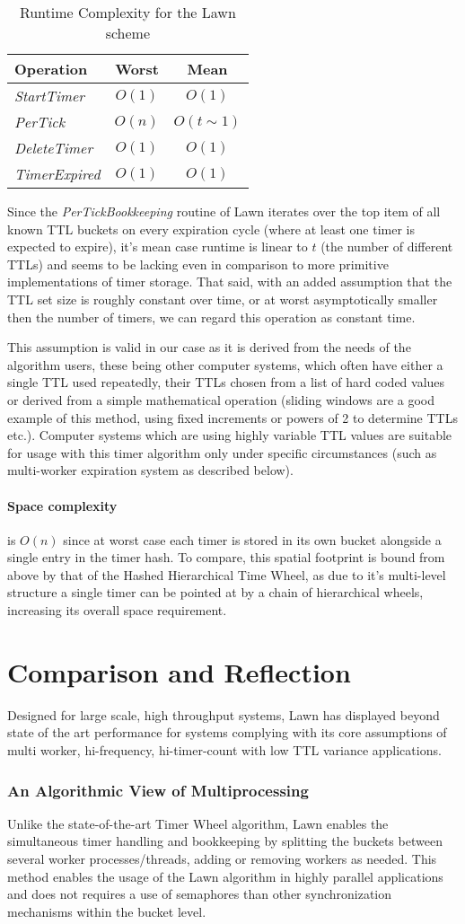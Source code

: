 \documentclass[twocolumn,a4paper]{article}
\newcommand{\advcomplexity}[9]{
\begin{table}[h!]
	\begin{center}
		\begin{tabular}{l|c|c}
			\textbf{Operation} & \textbf{Worst} & \textbf{Mean} \\
			\hline
			\textit{StartTimer} & $O(#1)$ & $O(#2)$ \\
			\textit{PerTick} & $O(#3)$ & $O(#4)$ \\
			\textit{DeleteTimer} & $O(#5)$ & $O(#6)$ \\
			\textit{TimerExpired} & $O(#7)$ & $O(#8)$ \\
		\end{tabular}
		\caption{Runtime Complexity for #9 scheme}
		\label{tab:table1}
	\end{center}
\end{table}
}
\begin{document}
\advcomplexity{1}{1}{n}{t\sim1}{1}{1}{1}{1}{the Lawn}

Since the \textit{PerTickBookkeeping} routine of Lawn iterates over the top item of all known TTL buckets on every expiration cycle (where at least one timer is expected to expire), it's mean case runtime is linear to $t$ (the number of different TTLs) and seems to be lacking even in comparison to more primitive implementations of timer storage. That said, with an added assumption that the TTL set size is roughly constant over time, or at worst asymptotically smaller then the number of timers, we can regard this operation as constant time.

This assumption is valid in our case as it is derived from the needs of the algorithm users, these being other computer systems, which often have either a single TTL used repeatedly, their TTLs chosen from a list of hard coded values or derived from a simple mathematical operation (sliding windows are a good example of this method, using fixed increments or powers of 2 to determine TTLs etc.). Computer systems which are using highly variable TTL values are suitable for usage with this timer algorithm only under specific circumstances (such as multi-worker expiration system as described below).


\paragraph{Space complexity} is $O(n)$ since at worst case each timer is stored in its own bucket alongside a single entry in the timer hash. To compare, this spatial footprint is bound from above by that of the Hashed Hierarchical Time Wheel, as due to it's multi-level structure a single timer can be pointed at by a chain of hierarchical wheels, increasing its overall space requirement.

\section{Comparison and Reflection}

Designed for large scale, high throughput systems, Lawn has displayed beyond state of the art performance for systems complying with its core assumptions of multi worker, hi-frequency, hi-timer-count with low TTL variance applications.


\subsubsection{An Algorithmic View of Multiprocessing}
Unlike the state-of-the-art Timer Wheel algorithm, Lawn enables the simultaneous timer handling and bookkeeping by splitting the buckets between several worker processes/threads, adding or removing workers as needed. This method enables the usage of the Lawn algorithm in highly parallel applications and does not requires a use of semaphores than other synchronization mechanisms within the bucket level.
\end{document}
